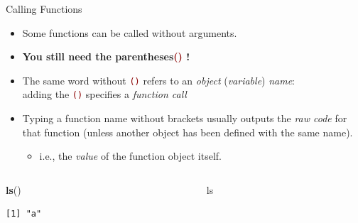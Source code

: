 \documentclass[
  11pt,
  ignorenonframetext,
]{beamer}
\newenvironment{Shaded}{\begin{snugshade}}{\end{snugshade}}
\newcommand{\FunctionTok}[1]{\textcolor[rgb]{0.13,0.29,0.53}{\textbf{#1}}}
\newcommand{\NormalTok}[1]{#1}
\providecommand{\tightlist}{%
  \setlength{\itemsep}{0pt}\setlength{\parskip}{0pt}}
\newcommand{\important}[1]{\textcolor{darkred}{#1}}
\begin{document}
\begin{frame}[fragile]{Calling Functions}
\protect\hypertarget{calling-functions}{}
\begin{itemize}
\tightlist
\item
  Some functions can be called without arguments.
\item
  \textbf{You still need the parentheses\important{()} !}
\item
  The same word without \important{\texttt{()}} refers to an
  \emph{object} (\emph{variable}) \emph{name}:\\
  adding the \important{\texttt{()}} specifies a \emph{function call}
\item
  Typing a function name without brackets usually outputs the \emph{raw
  code} for that function (unless another object has been defined with
  the same name).

  \begin{itemize}
  \tightlist
  \item
    i.e., the \emph{value} of the function object itself.
  \end{itemize}
\end{itemize}

\begin{columns}[T,onlytextwidth]
\begin{column}{0.48\textwidth}
\begin{Shaded}
\begin{Highlighting}[]
\FunctionTok{ls}\NormalTok{()}
\end{Highlighting}
\end{Shaded}

\begin{verbatim}
[1] "a"
\end{verbatim}
\end{column}

\begin{column}{0.48\textwidth}
\begin{Shaded}
\begin{Highlighting}[]
\NormalTok{ls}
\end{Highlighting}
\end{Shaded}


\end{column}
\end{columns}
\end{frame}
\end{document}

